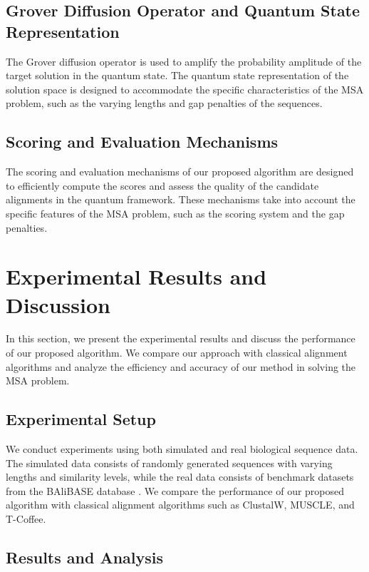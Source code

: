\subsection{Grover Diffusion Operator and Quantum State Representation}

The Grover diffusion operator is used to amplify the probability amplitude of the target solution in the quantum state. The quantum state representation of the solution space is designed to accommodate the specific characteristics of the MSA problem, such as the varying lengths and gap penalties of the sequences.

\subsection{Scoring and Evaluation Mechanisms}

The scoring and evaluation mechanisms of our proposed algorithm are designed to efficiently compute the scores and assess the quality of the candidate alignments in the quantum framework. These mechanisms take into account the specific features of the MSA problem, such as the scoring system and the gap penalties.

\section{Experimental Results and Discussion}

In this section, we present the experimental results and discuss the performance of our proposed algorithm. We compare our approach with classical alignment algorithms and analyze the efficiency and accuracy of our method in solving the MSA problem.

\subsection{Experimental Setup}

We conduct experiments using both simulated and real biological sequence data. The simulated data consists of randomly generated sequences with varying lengths and similarity levels, while the real data consists of benchmark datasets from the BAliBASE database \cite{thompson1999balibase}. We compare the performance of our proposed algorithm with classical alignment algorithms such as ClustalW, MUSCLE, and T-Coffee.

\subsection{Results and Analysis}

